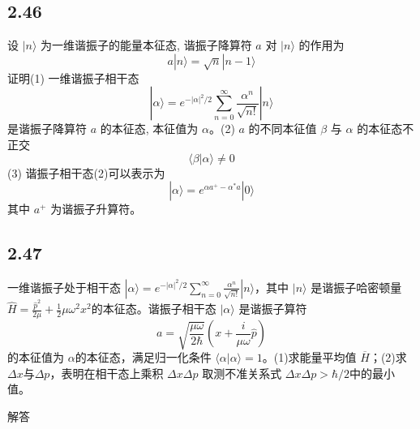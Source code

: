 \subsection{2.46}
设 $|n\rangle$ 为一维谐振子的能量本征态, 谐振子降算符 $a$ 对 $|n\rangle$ 的作用为
$$a|n\rangle = \sqrt{n}|n-1\rangle$$
证明(1) 一维谐振子相干态
$$|\alpha\rangle = e^{-|\alpha|^2/2} \sum_{n=0}^{\infty} \frac{\alpha^n}{\sqrt{n!}} |n\rangle$$
是谐振子降算符 $a$ 的本征态, 本征值为 $\alpha$。(2) $a$ 的不同本征值 $\beta$ 与 $\alpha$ 的本征态不正交
$$\langle \beta | \alpha \rangle \neq 0$$
(3) 谐振子相干态(2)可以表示为
$$|\alpha\rangle = e^{\alpha a^+ - \alpha^* a} |0\rangle$$
其中 $a^+$ 为谐振子升算符。

\subsection{2.47}
一维谐振子处于相干态 $|\alpha\rangle = e^{-|\alpha|^2/2} \sum_{n=0}^{\infty} \frac{\alpha^n}{\sqrt{n!}} |n\rangle$，其中 $|n\rangle$ 是谐振子哈密顿量 $\hat{H} = \frac{\hat{p}^2}{2\mu} + \frac{1}{2}\mu\omega^2 x^2$的本征态。谐振子相干态 $|\alpha\rangle$ 是谐振子算符
$$a = \sqrt{\frac{\mu\omega}{2\hbar}} \left( x + \frac{i}{\mu\omega} \hat{p} \right)$$
的本征值为 $\alpha$的本征态，满足归一化条件 $\langle \alpha | \alpha \rangle = 1$。(1)求能量平均值 $\overline{H}$；(2)求 $\Delta x$与$\Delta p$，表明在相干态上乘积 $\Delta x \Delta p$ 取测不准关系式 $\Delta x \Delta p > \hbar/2$中的最小值。

解答

